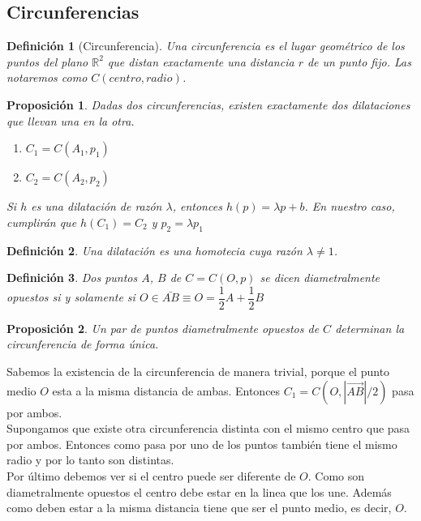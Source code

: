 \documentclass[11pt, a4paper]{article}
\makeatletter
\newif\IfInSansMode
\let\oldsf\sffamily
\renewcommand*{\sffamily}{\oldsf\mathversion{sans}\InSansModetrue}
\let\oldnorm\normalfont
\renewcommand*{\normalfont}{\oldnorm\InSansModefalse\mathversion{normal}}
\renewenvironment{proof}[1][\proofname] {\vspace{-15pt}\par\pushQED{\qed}\normalfont\topsep6\p@\@plus6\p@\relax\trivlist\item[\hskip\labelsep\it#1\@addpunct{.}]\ignorespaces}{\popQED\endtrivlist\@endpefalse}
\newcommand{\R}{\mathbb{R}}
\renewcommand{\vec}{\overrightarrow}
\renewenvironment{proof}[1][\proofname] {\par\pushQED{\qed}\normalfont\topsep6\p@\@plus6\p@\relax\trivlist\item[\hskip\labelsep\itshape\sffamily#1\@addpunct{.}]\ignorespaces}{\popQED\endtrivlist\@endpefalse}
\theoremstyle{theorem-style}
\newtheorem{nprop}{Proposición}[section]
\theoremstyle{definition-style}
\newtheorem{ndef}{Definición}[section]
\theoremstyle{remark-style}
\newtheorem*{nota}{Nota}
\theoremstyle{example-style}
\makeatother
\begin{document}



\subsection{Circunferencias}

\begin{ndef}[Circunferencia]
  Una circunferencia es el lugar geométrico de los puntos del plano $\R^2$ que distan exactamente una distancia $r$ de un punto fijo. Las notaremos como $C(centro,radio)$.
\end{ndef}


\begin{nprop}
  Dadas dos circunferencias, existen exactamente dos dilataciones que llevan una en la otra.
  \begin{enumerate}
  \item $C_1 = C(A_1,p_1)$
  \item $C_2 = C(A_2,p_2)$
  \end{enumerate}
  Si $h$ es una dilatación de razón $\lambda$, entonces $h(p) = \lambda p + b$.
  En nuestro caso, cumplirán que $h(C_1) = C_2$ y $p_2 = \lambda p_1$
\end{nprop}


\begin{ndef}
	Una dilatación es una homotecia cuya razón $\lambda \ne 1$.
\end{ndef}


\begin{ndef}
  Dos puntos $A$, $B$ de $C = C(O,p) $ se dicen diametralmente opuestos si y solamente si $O \in \bar{AB} \equiv O = \dfrac{1}{2}A + \dfrac{1}{2}B$
\end{ndef}


\begin{nprop}
  Un par de puntos diametralmente opuestos de $C$ determinan la circunferencia de forma única.
\end{nprop}
\begin{proof}
	Sabemos la existencia de la circunferencia de manera trivial, porque el punto medio $O$ esta a la misma distancia de ambas. Entonces $C_1 = C(O, |\vec{AB}|/2)$ pasa por ambos. \\
	Supongamos que existe otra circunferencia  distinta con el mismo centro que pasa por ambos. Entonces como pasa por uno de los puntos también tiene el mismo radio y por lo tanto son distintas.\\
	Por último debemos ver si el centro puede ser diferente de $O$. Como son diametralmente opuestos el centro debe estar en la linea que los une. Además como deben estar a la misma distancia tiene que ser el punto medio, es decir, $O$.
	
\end{proof}
\end{document}

